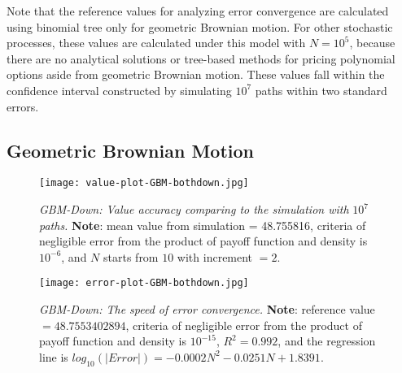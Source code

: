 Note that the reference values for analyzing error convergence are calculated using binomial tree only for geometric Brownian motion. For other stochastic processes, these values are calculated under this model with $N=10^5$, because there are no analytical solutions or tree-based methods for pricing polynomial options aside from geometric Brownian motion. These values fall within the confidence interval constructed by simulating $10^7$ paths within two standard errors. 
\newpage

\subsection{Geometric Brownian Motion}
\begin{figure}[H]
    \centering
    \texttt{[image: value-plot-GBM-bothdown.jpg]}
    \caption[\emph{GBM-Down: Value accuracy comparing to the simulation with} $10^7$ \emph{paths.}]{\emph{GBM-Down: Value accuracy comparing to the simulation with} $10^7$ \emph{paths.} \textbf{Note}: mean value from simulation = 48.755816, criteria of negligible error from the product of payoff function and density is $10^{-6}$, and $N$ starts from $10$  with increment $=2$.}
  
    \label{fig:label}
\end{figure}

\begin{figure}[H]
    \centering
    \texttt{[image: error-plot-GBM-bothdown.jpg]}
    \caption[\emph{GBM-Down: The speed of error convergence.}]{\emph{GBM-Down: The speed of error convergence.} \textbf{Note}: reference value $=48.7553402894$, criteria of negligible error from the product of payoff function and density is $10^{-15}$, $R^2=0.992$, and the regression line is $log_{10}\left(|Error|\right) = -0.0002N^2-0.0251N+1.8391$.}

    \label{fig:label}
\end{figure}


